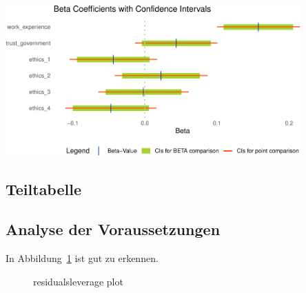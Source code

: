 \documentclass[
  a4paper,
  DIV=11,
  numbers=noendperiod]{scrartcl}
\begin{document}
\begin{center}
\includegraphics[width=0.85\textwidth,height=\textheight]{testthat_files/figure-pdf/unnamed-chunk-4-1.pdf}
\end{center}

\subsection{Teiltabelle}\label{teiltabelle}

\subsection{Analyse der
Voraussetzungen}\label{analyse-der-voraussetzungen}

In Abbildung~\ref{fig-reslev} ist gut zu erkennen.

\begin{figure}[H]


\caption{\label{fig-reslev}residualsleverage plot}

\end{figure}%
\end{document}
